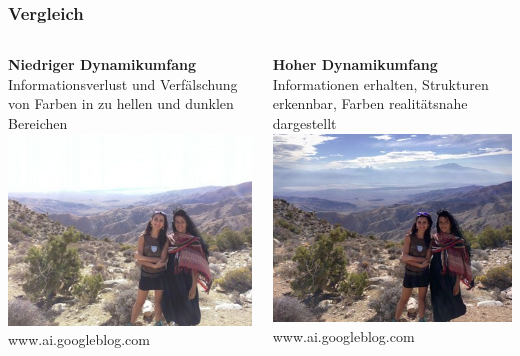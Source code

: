 \documentclass{beamer}
\begin{document}
	\begin{frame}
	\frametitle{Vergleich}
	\begin{columns}
		\begin{column}{0.5\textwidth}
			\begin{center}
				\textbf{Niedriger Dynamikumfang} \\
				\small Informationsverlust und Verfälschung von Farben in zu hellen und dunklen Bereichen \\
				\includegraphics[scale=0.35]{img/bild4.jpg}
				\tiny www.ai.googleblog.com
			\end{center}
		\end{column}
		\begin{column}{0.5\textwidth}
			\begin{center}
				\textbf{Hoher Dynamikumfang} \\
				\small Informationen erhalten, Strukturen erkennbar, Farben realitätsnahe dargestellt \\
				\includegraphics[scale=0.35]{img/bild5.jpg}
				\tiny www.ai.googleblog.com
			\end{center}
		\end{column}
	\end{columns}
	\end{frame}
	
\end{document}
